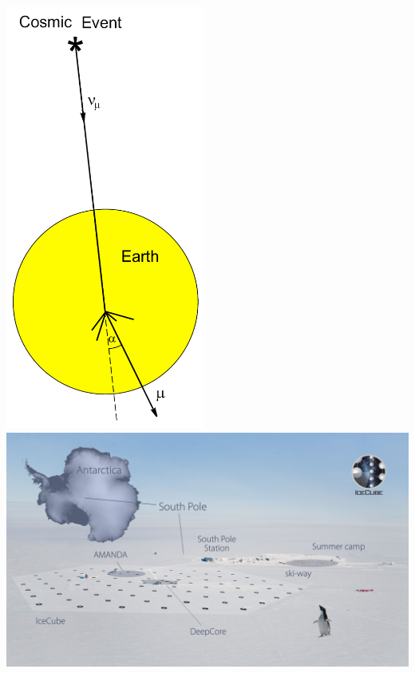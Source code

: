 \Tr
\onecolumn
\begin{center}
\includegraphics[keepaspectratio,height=14cm]{earth-shield} $\quad$
\includegraphics[keepaspectratio,width=18cm]{pole-view}
\end{center}


